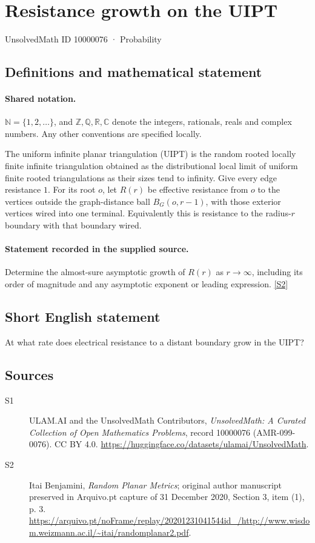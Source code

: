 \documentclass[11pt]{article}
\newcommand{\sref}[2]{\hyperlink{source:#1:#2}{[S#2]}}
\begin{document}
\setcounter{section}{10000075}
\section{Resistance growth on the UIPT}\label{10000076}
{\small\sffamily UnsolvedMath ID 10000076 · Probability}
\subsection{Definitions and mathematical statement}

\paragraph{Shared notation.}$\mathbb N=\{1,2,\ldots\}$, and $\mathbb Z,\mathbb Q,\mathbb R,\mathbb C$ denote the integers, rationals, reals and complex numbers. Any other conventions are specified locally.


The uniform infinite planar triangulation (UIPT) is the random rooted locally finite infinite triangulation obtained as the distributional local limit of uniform finite rooted triangulations as their sizes tend to infinity. Give every edge resistance $1$. For its root $o$, let $R(r)$ be effective resistance from $o$ to the vertices outside the graph-distance ball $B_G(o,r-1)$, with those exterior vertices wired into one terminal. Equivalently this is resistance to the radius-$r$ boundary with that boundary wired.
\paragraph{Statement recorded in the supplied source.}
Determine the almost-sure asymptotic growth of $R(r)$ as $r\to\infty$, including its order of magnitude and any asymptotic exponent or leading expression. \sref{10000076}{2}
\subsection{Short English statement}
At what rate does electrical resistance to a distant boundary grow in the UIPT?
\subsection{Sources}
\begin{description}
\item[\hypertarget{source:10000076:1}{S1}] ULAM.AI and the UnsolvedMath Contributors, \emph{UnsolvedMath: A Curated Collection of Open Mathematics Problems}, record 10000076 (AMR-099-0076). CC BY 4.0. \url{https://huggingface.co/datasets/ulamai/UnsolvedMath}.
\item[\hypertarget{source:10000076:2}{S2}] Itai Benjamini, \emph{Random Planar Metrics}; original author manuscript preserved in Arquivo.pt capture of 31 December 2020, Section 3, item (1), p. 3. \url{https://arquivo.pt/noFrame/replay/20201231041544id_/http://www.wisdom.weizmann.ac.il/~itai/randomplanar2.pdf}.
\end{description}
\label{end:10000076}
\end{document}
